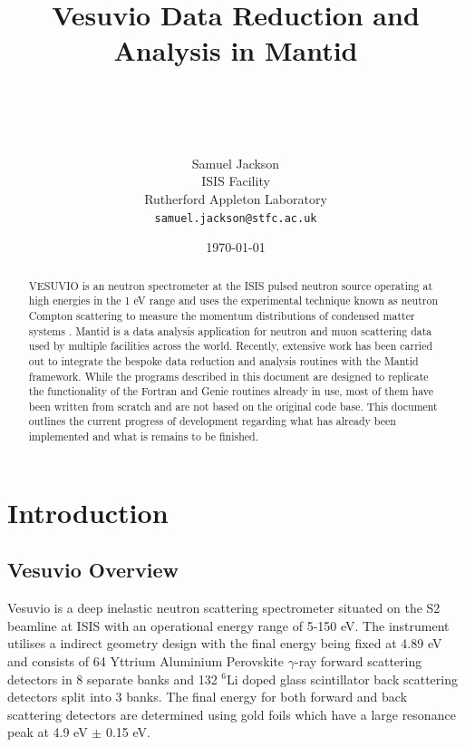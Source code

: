 \documentclass[paper=a4, fontsize=11pt]{scrartcl}	%
\title{ \vspace{-1in} 	\usefont{OT1}{bch}{b}{n}
		\huge \strut Vesuvio Data Reduction and Analysis in Mantid \strut \\
}
\author{ 									\usefont{OT1}{bch}{m}{n}
        Samuel Jackson\\		\usefont{OT1}{bch}{m}{n}
        ISIS Facility\\	\usefont{OT1}{bch}{m}{n}
        Rutherford Appleton Laboratory\\
        \texttt{samuel.jackson@stfc.ac.uk}
}
\date{\today}
\numberwithin{equation}{section}															%
\numberwithin{figure}{section}																%
\numberwithin{table}{section}
\begin{document}
\maketitle
\clearpage
\tableofcontents
\clearpage
\begin{abstract}
VESUVIO is an neutron spectrometer at the ISIS pulsed neutron source operating at high energies in the 1 eV range and uses the experimental technique known as neutron Compton scattering to measure the momentum distributions of condensed matter systems \citep{mayers2012vesuvio}. Mantid \citep{mantid} is a data analysis application for neutron and muon scattering data used by multiple facilities across the world. Recently, extensive work has been carried out to integrate the bespoke data reduction and analysis routines with the Mantid framework. While the programs described in this document are designed to replicate the functionality of the Fortran and Genie routines already in use, most of them have been written from scratch and are not based on the original code base. This document outlines the current progress of development regarding what has already been implemented and what is remains to be finished.
\end{abstract}

\section{Introduction}
\label{sec:introduction}
\subsection{Vesuvio Overview}
\label{subsec:vesuvio-overview}
Vesuvio is a deep inelastic neutron scattering spectrometer situated on the S2 beamline at ISIS with an operational energy range of 5-150 eV. The instrument utilises a indirect geometry design with the final energy being fixed at 4.89 eV \cite{mayers2011calibration} and consists of 64 Yttrium Aluminium Perovskite $\gamma$-ray forward scattering detectors in 8 separate banks and 132 $^6$Li doped glass scintillator back scattering detectors split into 3 banks. The final energy for both forward and back scattering detectors are determined using gold foils which have a large resonance peak at 4.9 eV $\pm$ 0.15 eV. 
\end{document}
